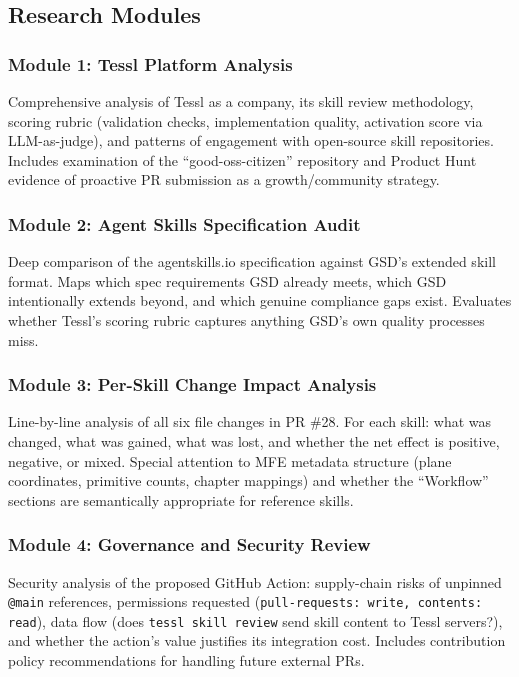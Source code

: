 \documentclass[11pt,letterpaper]{article}
\begin{document}
\subsection{Research Modules}

\subsubsection{Module 1: Tessl Platform Analysis}
Comprehensive analysis of Tessl as a company, its skill review methodology, scoring rubric (validation checks, implementation quality, activation score via LLM-as-judge), and patterns of engagement with open-source skill repositories. Includes examination of the ``good-oss-citizen'' repository and Product Hunt evidence of proactive PR submission as a growth/community strategy.

\subsubsection{Module 2: Agent Skills Specification Audit}
Deep comparison of the agentskills.io specification against GSD's extended skill format. Maps which spec requirements GSD already meets, which GSD intentionally extends beyond, and which genuine compliance gaps exist. Evaluates whether Tessl's scoring rubric captures anything GSD's own quality processes miss.

\subsubsection{Module 3: Per-Skill Change Impact Analysis}
Line-by-line analysis of all six file changes in PR \#28. For each skill: what was changed, what was gained, what was lost, and whether the net effect is positive, negative, or mixed. Special attention to MFE metadata structure (plane coordinates, primitive counts, chapter mappings) and whether the ``Workflow'' sections are semantically appropriate for reference skills.

\subsubsection{Module 4: Governance and Security Review}
Security analysis of the proposed GitHub Action: supply-chain risks of unpinned \texttt{@main} references, permissions requested (\texttt{pull-requests: write, contents: read}), data flow (does \texttt{tessl skill review} send skill content to Tessl servers?), and whether the action's value justifies its integration cost. Includes contribution policy recommendations for handling future external PRs.
\end{document}
